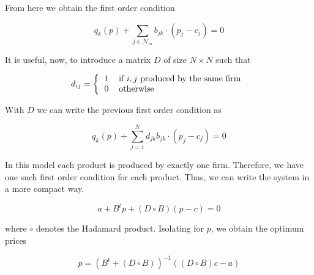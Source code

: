 \documentclass{tfg}
\begin{document}
From here we obtain the first order condition

\begin{equation*}
q_k(p) + \sum_{j \in \mathcal{N}_m} b_{jk} \cdot (p_j - c_j) = 0
\end{equation*}

It is useful, now, to introduce a matrix $D$ of size $N \times N$ such that

\begin{equation*}
d_{ij} = \left\{
\begin{tabular}{ll}
1 & if $i,j$ produced by the same firm\\
0 & otherwise
\end{tabular}\right.
\end{equation*}

With $D$ we can write the previous first order condition as

\begin{equation*}
q_k(p) + \sum_{j = 1}^N d_{jk}b_{jk} \cdot (p_j - c_j) = 0
\end{equation*}

In this model each product is produced by exactly one firm. Therefore, we have one such first order condition for each product. Thus, we can write the system in a more compact way. 

\begin{equation*}
a + B^t p + (D \circ B)(p - c) = 0
\end{equation*}

where $\circ$ denotes the Hadamard product.
Isolating for $p$, we obtain the optimum prices

\begin{equation*}
p = (B^t + (D \circ B))^{-1}((D \circ B) c - a)
\end{equation*}




%



%
%
%
\end{document}
